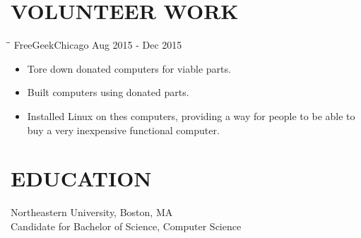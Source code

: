 \documentclass{res}
\begin{document}
\begin{resume}
        \section{VOLUNTEER WORK}
\vspace{-0.1in}
\begin{tabbing}
  \hspace{2.3in}\= \hspace{2.6in}\= \kill
  FreeGeekChicago \>\> Aug 2015 - Dec 2015
\end{tabbing}
\begin{itemize} \itemsep -2pt
\item Tore down donated computers for viable parts.
\item Built computers using donated parts.
  \item Installed Linux on thes computers, providing a way for people to be able to buy a very inexpensive functional computer.
\end{itemize}
        \section{EDUCATION}
Northeastern University, Boston, MA \\
Candidate for Bachelor of Science, Computer Science   \\

\end{resume}
\end{document}
